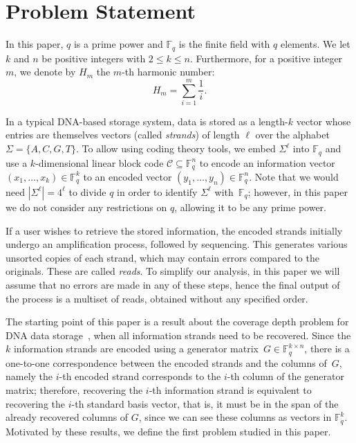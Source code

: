 \documentclass[11pt,a4paper,reqno,twoside]{article}
\theoremstyle{definition}
\newcommand{\F}{\mathbb{F}}
\begin{document}
\section{Problem Statement} \label{problem_statement}
In this paper, $q$ is a prime power and $\mathbb{F}_q$ is the finite field with $q$ elements. We let $k$ and $n$ be positive integers with $2 \leq k \leq n$. Furthermore, for a positive integer $m$, we
denote by $H_m$ the $m$-th harmonic number: 
$$H_m=\sum_{i=1}^m \frac{1}{i}.$$

In a typical DNA-based storage system, data is stored as a length-$k$ vector whose entries are themselves vectors (called \textit{strands}) of length $\ell$ over the alphabet $\Sigma = \{ A,C,G,T \}$.
To allow using coding theory tools, we embed $\Sigma^\ell$ into $\mathbb{F}_q$ and use a $k$-dimensional linear block code $\mathcal{C} \subseteq \mathbb{F}_q^n$ to encode an information vector $(x_1, \dots, x_k) \in \mathbb{F}_q^k$ to an encoded vector $(y_1, \dots, y_n) \in \mathbb{F}_q^n$. Note that we would need $|\Sigma^\ell| = 4^\ell$ to divide $q$ in order to identify $\Sigma^\ell$ with~$\F_q$; however, in this paper we do not consider any restrictions on $q$, allowing it to be any prime power.

If a user wishes to retrieve the stored information, the encoded strands initially undergo an amplification process, followed by sequencing.
This generates various unsorted copies of each strand, which may contain errors compared to the originals. These are called \textit{reads}. To simplify our analysis, in this paper we will assume that no errors are made in any of these steps, hence the final output of the process is a multiset of reads, obtained without any specified order. 

The starting point of this paper is a result about the coverage depth problem for DNA data storage~\cite{cover_your_bases}, when all information strands need to be recovered. Since the $k$ information strands are encoded using a generator matrix~$G \in \mathbb{F}_q^{k \times n}$, there is a one-to-one correspondence between the encoded strands and the columns of~$G$, namely the $i$-th encoded strand corresponds to the $i$-th column of the generator matrix; therefore, recovering the $i$-th information strand is equivalent to recovering the $i$-th standard basis vector, that is, it must be in the span of the already recovered columns of $G$, since we can see these columns as vectors in $\mathbb{F}_q^k$. Motivated by these results, we  define the first problem studied in this paper.
\end{document}
